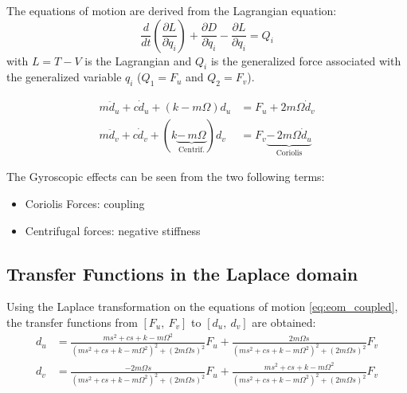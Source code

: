 \documentclass{ISMA_USD2020}
\begin{document}
The equations of motion are derived from the Lagrangian equation:
\begin{equation}
\label{eq:lagrangian_equations}
  \frac{d}{dt} \left( \frac{\partial L}{\partial \dot{q}_i} \right) + \frac{\partial D}{\partial \dot{q}_i} - \frac{\partial L}{\partial q_i} = Q_i
\end{equation}
with \(L = T - V\) is the Lagrangian and \(Q_i\) is the generalized force associated with the generalized variable \(q_i\) (\(Q_1 = F_u\) and \(Q_2 = F_v\)).

\begin{subequations}
\label{eq:eom_coupled}
  \begin{align}
    m \ddot{d}_u + c \dot{d}_u + ( k - m \Omega ) d_u &= F_u + 2 m \Omega \dot{d}_v \\
    m \ddot{d}_v + c \dot{d}_v + ( k \underbrace{-\,m \Omega}_{\text{Centrif.}} ) d_v &= F_v \underbrace{-\,2 m \Omega \dot{d}_u}_{\text{Coriolis}}
  \end{align}
\end{subequations}

The Gyroscopic effects can be seen from the two following terms:
\begin{itemize}
\item Coriolis Forces: coupling
\item Centrifugal forces: negative stiffness
\end{itemize}

\subsection{Transfer Functions in the Laplace domain}
\label{sec:org55c9228}

Using the Laplace transformation on the equations of motion \eqref{eq:eom_coupled}, the transfer functions from \([F_u,\ F_v]\) to \([d_u,\ d_v]\) are obtained:
\begin{subequations}
\label{eq:oem_laplace_domain}
  \begin{align}
    d_u &= \frac{ms^2 + cs + k - m \Omega^2}{\left( m s^2 + cs + k - m \Omega^2 \right)^2 + \left( 2 m \Omega s \right)^2} F_u +  \frac{2 m \Omega s}{\left( m s^2 + cs + k - m \Omega^2 \right)^2 + \left( 2 m \Omega s \right)^2} F_v \\
    d_v &= \frac{-2 m \Omega s}{\left( m s^2 + cs + k - m \Omega^2 \right)^2 + \left( 2 m \Omega s \right)^2} F_u +  \frac{ms^2 + cs + k - m \Omega^2}{\left( m s^2 + cs + k - m \Omega^2 \right)^2 + \left( 2 m \Omega s \right)^2} F_v
  \end{align}
\end{subequations}
\end{document}
